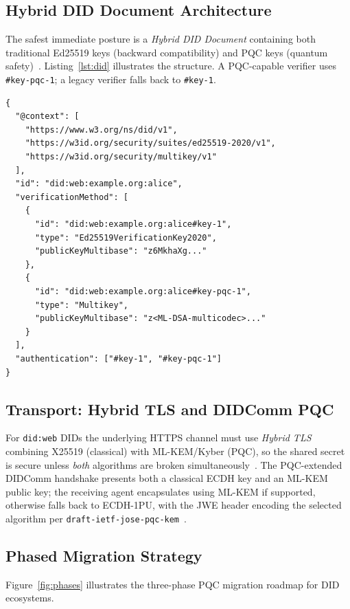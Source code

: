 \documentclass[sigconf,nonacm]{acmart}
\begin{document}
\subsection{Hybrid DID Document Architecture}

The safest immediate posture is a \emph{Hybrid DID Document} containing
both traditional Ed25519 keys (backward compatibility) and PQC keys
(quantum safety)~\cite{linkedin2024}.  Listing~\ref{lst:did} illustrates
the structure.  A PQC-capable verifier uses \texttt{\#key-pqc-1}; a
legacy verifier falls back to \texttt{\#key-1}.

\begin{lstlisting}[caption={Hybrid DID Document with Ed25519 and
  ML-DSA verification methods~\cite{linkedin2024}.},
  label=lst:did, float=h]
{
  "@context": [
    "https://www.w3.org/ns/did/v1",
    "https://w3id.org/security/suites/ed25519-2020/v1",
    "https://w3id.org/security/multikey/v1"
  ],
  "id": "did:web:example.org:alice",
  "verificationMethod": [
    {
      "id": "did:web:example.org:alice#key-1",
      "type": "Ed25519VerificationKey2020",
      "publicKeyMultibase": "z6MkhaXg..."
    },
    {
      "id": "did:web:example.org:alice#key-pqc-1",
      "type": "Multikey",
      "publicKeyMultibase": "z<ML-DSA-multicodec>..."
    }
  ],
  "authentication": ["#key-1", "#key-pqc-1"]
}
\end{lstlisting}

\subsection{Transport: Hybrid TLS and DIDComm PQC}

For \texttt{did:web} DIDs the underlying HTTPS channel must use
\emph{Hybrid TLS} combining X25519 (classical) with ML-KEM/Kyber (PQC),
so the shared secret is secure unless \emph{both} algorithms are broken
simultaneously~\cite{linkedin2024}.  The PQC-extended DIDComm handshake
presents both a classical ECDH key and an ML-KEM public key; the
receiving agent encapsulates using ML-KEM if supported, otherwise falls
back to ECDH-1PU, with the JWE header encoding the selected algorithm
per \texttt{draft-ietf-jose-pqc-kem}~\cite{linkedin2024}.

\subsection{Phased Migration Strategy}

Figure~\ref{fig:phases} illustrates the three-phase PQC migration
roadmap for DID ecosystems.
\end{document}
